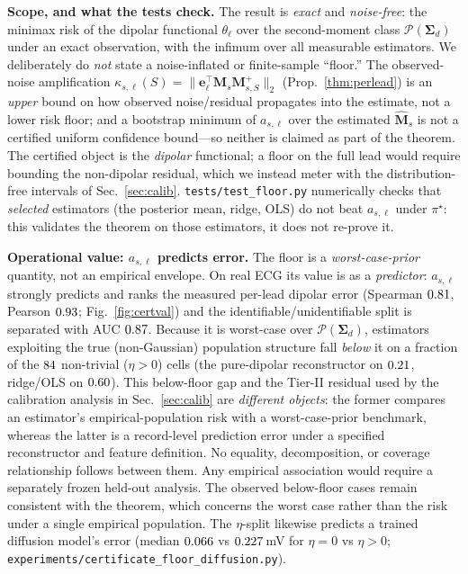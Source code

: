 \smallskip
\noindent\textbf{Scope, and what the tests check.} The result is \emph{exact} and \emph{noise-free}:
the minimax risk of the dipolar functional $\theta_\ell$ over the second-moment class
$\mathcal P(\bm\Sigma_d)$ under an exact observation, with the infimum over all measurable estimators.
We deliberately do \emph{not} state a noise-inflated or finite-sample ``floor.'' The observed-noise
amplification $\kappa_{s,\ell}(S)=\|\bm e_\ell^\top\bm M_s\bm M_{s,S}^{+}\|_2$ (Prop.~\ref{thm:perlead})
is an \emph{upper} bound on how observed noise/residual propagates into the estimate, not a lower risk
floor; and a bootstrap minimum of $a_{s,\ell}$ over the estimated $\widehat{\bm M}_s$ is not a
certified uniform confidence bound---so neither is claimed as part of the theorem. The certified
object is the \emph{dipolar} functional; a floor on the full lead would require bounding the
non-dipolar residual, which we instead meter with the distribution-free intervals of
Sec.~\ref{sec:calib}. \texttt{tests/test\_floor.py} numerically checks that \emph{selected} estimators
(the posterior mean, ridge, OLS) do not beat $a_{s,\ell}$ under $\pi^\star$: this validates the
theorem on those estimators, it does not re-prove it.

\smallskip
\noindent\textbf{Operational value: $a_{s,\ell}$ predicts error.} The floor is a
\emph{worst-case-prior} quantity, not an empirical envelope. On real ECG its value is as a
\emph{predictor}: $a_{s,\ell}$ strongly predicts and ranks the measured per-lead dipolar error
(Spearman $0.81$, Pearson $0.93$; Fig.~\ref{fig:certval}) and the
identifiable/unidentifiable split is separated with AUC $0.87$. Because it is worst-case over
$\mathcal P(\bm\Sigma_d)$, estimators exploiting the true (non-Gaussian) population structure fall
\emph{below} it on a fraction of the $84$ non-trivial ($\eta{>}0$) cells (the pure-dipolar
reconstructor on $0.21$, ridge/OLS on $0.60$). This below-floor gap and the
Tier-II residual used by the calibration analysis in Sec.~\ref{sec:calib} are \emph{different
objects}: the former compares an estimator's empirical-population risk with a worst-case-prior
benchmark, whereas the latter is a record-level prediction error under a specified reconstructor and
feature definition. No equality, decomposition, or coverage relationship follows between them. Any
empirical association would require a separately frozen held-out analysis. The observed below-floor
cases remain consistent with the theorem, which concerns the worst case rather than the risk under a
single empirical population.
The $\eta$-split likewise predicts a trained diffusion model's error (median $0.066$ vs
$0.227$\,mV for $\eta{=}0$ vs $\eta{>}0$;
\texttt{experiments/certificate\_floor\_diffusion.py}).
